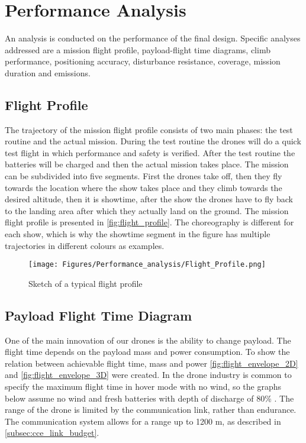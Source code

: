 \section{Performance Analysis}

An analysis is conducted on the performance of the final design. Specific analyses addressed are a mission flight profile, payload-flight time diagrams, climb performance, positioning accuracy, disturbance resistance, coverage, mission duration and emissions.

\subsection{Flight Profile}
\label{sub:flightprofile}
The trajectory of the mission flight profile consists of two main phases: the test routine and the actual mission. During the test routine the drones will do a quick test flight in which performance and safety is verified. After the test routine the batteries will be charged and then the actual mission takes place. The mission can be subdivided into five segments. First the drones take off, then they fly towards the location where the show takes place and they climb towards the desired altitude, then it is showtime, after the show the drones have to fly back to the landing area after which they actually land on the ground. The mission flight profile is presented in \autoref{fig:flight_profile}. The choreography is different for each show, which is why the showtime segment in the figure has multiple trajectories in different colours as examples.

\begin{figure}[h]
    \centering
    \texttt{[image: Figures/Performance\_analysis/Flight\_Profile.png]}
    \caption{Sketch of a typical flight profile}
    \label{fig:flight_profile}
\end{figure}

\subsection{Payload Flight Time Diagram}
One of the main innovation of our drones is the ability to change payload. The flight time depends on the payload mass and power consumption. To show the relation between achievable flight time, mass and power \autoref{fig:flight_envelope_2D} and \autoref{fig:flight_envelope_3D} were created. In the drone industry is common to specify the maximum flight time in hover mode with no wind, so the graphs below assume no wind and fresh batteries with depth of discharge of 80\% . The range of the drone is limited by the communication link, rather than endurance. The communication system allows for a range up to 1200 m, as described in \autoref{subsec:cce_link_budget}. 

